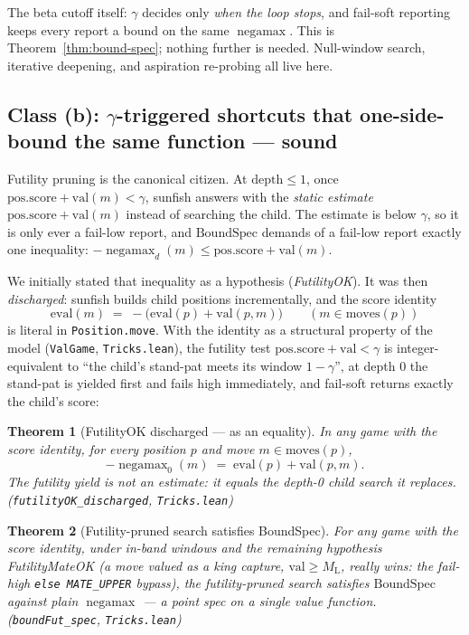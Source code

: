 \documentclass[11pt]{article}
\DeclareMathOperator{\negamax}{negamax}
\newcommand{\ML}{M_{\mathrm{L}}}    %
\newcommand{\leanref}[2]{(\texttt{#1}, \texttt{#2})}%
\theoremstyle{plain}
\newtheorem{theorem}{Theorem}[section]
\theoremstyle{definition}
\theoremstyle{remark}
\begin{document}
The beta cutoff itself: $\gamma$ decides only \emph{when the loop
stops}, and fail-soft reporting keeps every report a bound on the same
$\negamax$.  This is Theorem~\ref{thm:bound-spec}; nothing further is
needed.  Null-window search, iterative deepening, and aspiration
re-probing all live here.

\subsection{Class (b): \texorpdfstring{$\gamma$}{gamma}-triggered
shortcuts that one-side-bound the same function --- sound}

Futility pruning is the canonical citizen.  At $\mathrm{depth} \le 1$,
once $\mathrm{pos.score} + \mathrm{val}(m) < \gamma$, sunfish answers
with the \emph{static estimate} $\mathrm{pos.score} + \mathrm{val}(m)$
instead of searching the child.  The estimate is below $\gamma$, so it
is only ever a fail-low report, and $\mathrm{BoundSpec}$ demands of a
fail-low report exactly one inequality:
$-\negamax_d(m) \le \mathrm{pos.score} + \mathrm{val}(m)$.

We initially stated that inequality as a hypothesis
(\emph{FutilityOK}).  It was then \emph{discharged}: sunfish builds
child positions incrementally, and the score identity
\[
  \mathrm{eval}(m) \;=\; -\bigl(\mathrm{eval}(p) + \mathrm{val}(p, m)\bigr)
  \qquad (m \in \mathrm{moves}(p))
\]
is literal in \texttt{Position.move}.  With the identity as a
structural property of the model \leanref{ValGame}{Tricks.lean}, the
futility test $\mathrm{pos.score} + \mathrm{val} < \gamma$ is
integer-equivalent to ``the child's stand-pat meets its window
$1-\gamma$'', at depth 0 the stand-pat is yielded first and fails high
immediately, and fail-soft returns exactly the child's score:

\begin{theorem}[FutilityOK discharged --- as an equality]
\label{thm:futility}
In any game with the score identity, for every position $p$ and move
$m \in \mathrm{moves}(p)$,
\[
  -\negamax_0(m) \;=\; \mathrm{eval}(p) + \mathrm{val}(p, m).
\]
The futility yield is not an estimate: it \emph{equals} the depth-0
child search it replaces.
\leanref{futilityOK\_discharged}{Tricks.lean}
\end{theorem}

\begin{theorem}[Futility-pruned search satisfies BoundSpec]
\label{thm:boundfut}
For any game with the score identity, under in-band windows and the
remaining hypothesis \emph{FutilityMateOK} (a move valued as a king
capture, $\mathrm{val} \ge \ML$, really wins: the fail-high
\texttt{else MATE\_UPPER} bypass), the futility-pruned search satisfies
$\mathrm{BoundSpec}$ against plain $\negamax$ --- a point spec on a
single value function.
\leanref{boundFut\_spec}{Tricks.lean}
\end{theorem}
\end{document}
